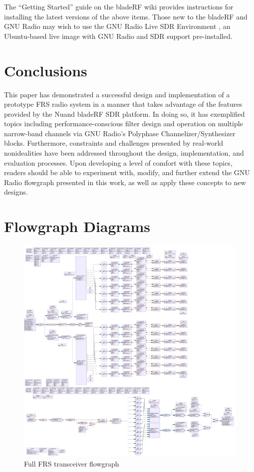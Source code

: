 The ``Getting Started'' guide on the bladeRF wiki
\cite{BLADERF_GETTING_STARTED} provides instructions for installing the latest
versions of the above items. Those new to the bladeRF and GNU Radio may wish to
use the GNU Radio Live SDR Environment \cite{GNU_RADIO_LIVE_IMAGE} , an
Ubuntu-based live image with GNU Radio and SDR support pre-installed.

\section{Conclusions}
This paper has demonstrated a successful design and implementation of a
prototype \ac{FRS} radio system in a manner that takes advantage of the
features provided by the Nuand bladeRF \ac{SDR} platform. In doing so, it has
exemplified topics including performance-conscious filter design and operation
on multiple narrow-band channels via GNU Radio's Polyphase
Channelizer/Synthesizer blocks. Furthermore, constraints and challenges
presented by real-world nonidealities have been addressed throughout the
design, implementation, and evaluation processes.  Upon developing a level of
comfort with these topics, readers should be able to experiment with, modify,
and further extend the GNU Radio flowgraph presented in this work, as well as
apply these concepts to new designs.

\newpage
\section{Flowgraph Diagrams} \label{sec:diagrams}
\begin{figure}[h!]
  \label{fig:full_flowgraph}
  \centering
  \includegraphics[width=6.5in]{images/frs/bladeRF_frs_grc.png}
  \caption{Full FRS transceiver flowgraph}
\end{figure}

